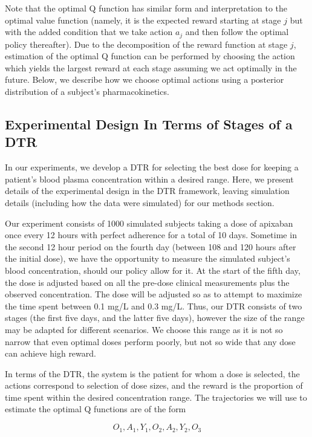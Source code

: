 Note that the optimal Q function has similar form and interpretation to the optimal value function (namely, it is the expected reward starting at stage $ j $ but with the added condition that we take action $ a_j $ and then follow the optimal policy thereafter). Due to the decomposition of the reward function at stage $ j $, estimation of the optimal Q function can be performed by choosing the action which yields the largest reward at each stage assuming we act optimally in the future.  Below, we describe how we choose optimal actions using a posterior distribution of a subject’s pharmacokinetics.

\subsection{Experimental Design In Terms of Stages of a DTR}

In our experiments, we develop a DTR for selecting the best dose for keeping a patient’s blood plasma concentration within a desired range. Here, we present details of the experimental design in the DTR framework, leaving simulation details (including how the data were simulated) for our methods section.

Our experiment consists of 1000 simulated subjects taking a dose of apixaban once every 12 hours with perfect adherence for a total of 10 days.  Sometime in the second 12 hour period on the fourth day (between 108 and 120 hours after the initial dose), we have the opportunity to measure  the simulated subject’s blood concentration, should our policy allow for it.  At the start of the fifth day, the dose is adjusted based on all the pre-dose clinical measurements plus the observed concentration. The dose will be adjusted so as to attempt to maximize the time spent between 0.1 mg/L and 0.3 mg/L. Thus, our DTR consists of two stages (the first five days, and the latter five days), however the size of the range may be adapted for different scenarios. We choose this range as it is not so narrow that even optimal doses perform poorly, but not so wide that any dose can achieve high reward. 

In terms of the DTR, the system is the patient for whom a dose is selected, the actions correspond to selection of dose sizes, and the reward is the proportion of time spent within the desired concentration range. The trajectories we will use to estimate the optimal Q functions are of the form

\begin{equation}\label{key}
O_1, A_1, Y_1, O_2, A_2, Y_2, O_3
\end{equation}

